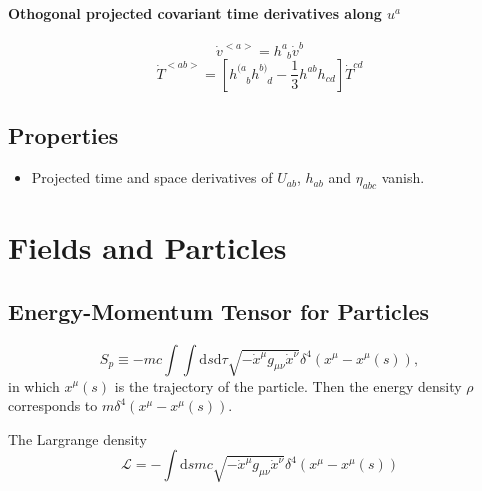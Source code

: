 \documentclass[12pt,a4paper]{book}
\begin{document}
\paragraph{Othogonal projected covariant time derivatives along $u^a$}
\begin{equation}
	\dot v^{<a>} = h^a_{\phantom a b} \dot v^b
\end{equation}
\begin{equation}
	\dot T^{<ab>} = [ h^{(a}_{\phantom{(a}b} h^{b)}_{\phantom{b)} d} - \frac 1 3 h^{ab}h_{cd} ]\dot T^{cd}
\end{equation}


\subsection{Properties}

\begin{itemize}
	\item 
Projected time and space derivatives of $U_{ab}$, $h_{ab}$ and $\eta_{abc}$ vanish.
\end{itemize}



















\section{Fields and Particles}

\subsection{Energy-Momentum Tensor for Particles}

\begin{equation}
S_p \equiv -m c \int \int \mathrm d s\mathrm d\tau \sqrt{-\dot x ^\mu g_{\mu\nu} \dot x^\nu} \delta^4(x^\mu - x^\mu (s))    ,
\end{equation}
in which $x^\mu(s)$ is the trajectory of the particle. Then the energy density $\rho$ corresponds to $m\delta^4(x^\mu- x^\mu(s))$.

The Largrange density
\begin{equation}
\mathcal L = -\int\mathrm ds mc \sqrt{-\dot x^\mu g_{\mu\nu}\dot x^\nu}\delta^4(x^\mu - x^\mu(s))
\end{equation}
\end{document}
